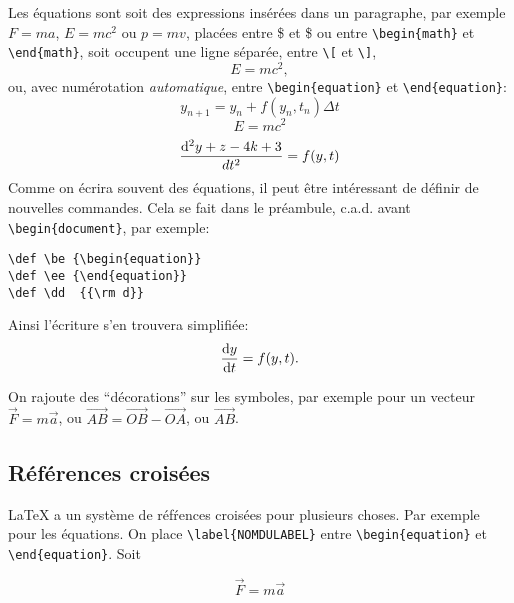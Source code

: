 \documentclass[a4paper,12pt,twoside]{article}
\def \be {\begin{equation}}
\def \ee {\end{equation}}
\def \dd  {{\rm d}}
\begin{document}
 
Les \'equations sont soit des expressions ins\'er\'ees dans un paragraphe, par exemple 
$F=ma$, \(E=mc^2\) ou \begin{math} p=mv \end{math}, 
plac\'ees entre \$ et \$ ou entre \verb|\begin{math}| et \verb|\end{math}|, 
soit occupent une ligne s\'epar\'ee, entre \verb|\[| et \verb|\]|,
\[ E=mc^2, \]
ou, avec num\'erotation {\it automatique}, entre \verb|\begin{equation}| 
et \verb|\end{equation}|:
\be
y_{n+1}=y_n+f(y_{n},t_n)\Delta t %
\ee
\begin{equation}
E=mc^2
\end{equation}
\begin{equation}
\frac{\dd^2y+z-4k+3}{dt^2} = f(y,t)
\end{equation}
Comme on \'ecrira souvent des \'equations, il peut \^etre int\'eressant de d\'efinir de nouvelles commandes. Cela se fait dans le pr\'eambule, c.a.d. avant \verb|\begin{document}|, par exemple:
\begin{verbatim}
\def \be {\begin{equation}}
\def \ee {\end{equation}}
\def \dd  {{\rm d}}
\end{verbatim}
Ainsi  l'\'ecriture s'en trouvera simplifi\'ee: 
\be
\frac{\dd y}{\dd t}=                    f(y,t)      . %
\ee

On rajoute des ``d\'ecorations'' sur les symboles, par exemple pour un vecteur 
$\vec{F}=m\vec{a}$, ou $\vec{AB}=\vec{OB}-\vec{OA}$, ou 
$\overrightarrow{AB}$.  

\subsection{R\'ef\'erences crois\'ees} \label{sec:figures} %

\LaTeX{} a un syst\`eme de r\'ef\'rences crois\'ees pour plusieurs choses. 
Par exemple pour les \'equations. On place \verb|\label{NOMDULABEL}| entre 
\verb|\begin{equation}| et \verb|\end{equation}|.   Soit

\begin{equation} \label{NOMDULABEL}
\vec{F} =m\vec{a}
\end{equation}
\end{document}
